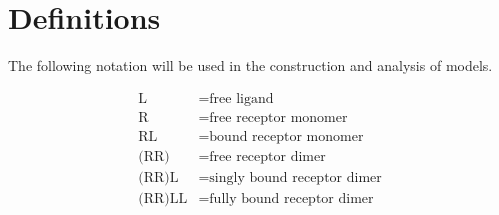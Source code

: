 \section{Definitions}

The following notation will be used in the construction and analysis of models.

\begin{align*}
\text{L}& = \text{free ligand} \\ 
\text{R}& = \text{free receptor monomer} \\
\text{RL}& = \text{bound receptor monomer} \\
\text{(RR)}& = \text{free receptor dimer} \\
\text{(RR)L}& = \text{singly bound receptor dimer} \\
\text{(RR)LL}& = \text{fully bound receptor dimer} \\
\end{align*}




